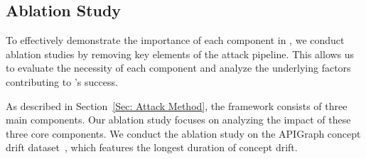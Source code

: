 \subsection{Ablation Study}
To effectively demonstrate the importance of each component in \pandora, we conduct ablation studies by removing key elements of the attack pipeline.
This allows us to evaluate the necessity of each component and analyze the underlying factors contributing to \pandora’s success.
\begin{table}[h!]
	\caption{Attack value assessment necessity analysis}
	\label{tab: Attack Value Assessment necessity analysis}
	\setlength{\tabcolsep}{5.8pt}
	\begin{center}
	\end{center}
\end{table}
As described in Section~\ref{Sec: Attack Method}, the \pandora framework consists of three main components.
Our ablation study focuses on analyzing the impact of these three core components.
We conduct the ablation study on the APIGraph concept drift dataset~\cite{2020-CCS-APIGraph}, which features the longest duration of concept drift.
